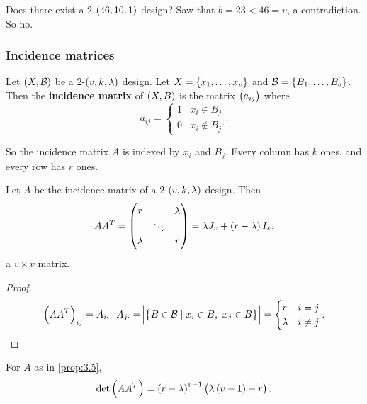 
\begin{example*}
Does there exist a $ 2 $-$ \br{46, 10, 1} $ design? Saw that $ b = 23 < 46 = v $, a contradiction. So no.
\end{example*}

\subsubsection{Incidence matrices}

\begin{definition*}
Let $ \br{X, \BB} $ be a $ 2 $-$ \br{v, k, \lambda} $ design. Let $ X = \cbr{x_1, \dots, x_v} $ and $ \BB = \cbr{B_1, \dots, B_b} $. Then the \textbf{incidence matrix} of $ \br{X, B} $ is the matrix $ \br{a_{ij}} $ where
$$ a_{ij} =
\begin{cases}
1 & x_i \in B_j \\
0 & x_i \notin B_j
\end{cases}.
$$
\end{definition*}

So the incidence matrix $ A $ is indexed by $ x_i $ and $ B_j $. Every column has $ k $ ones, and every row has $ r $ ones.

\begin{proposition}
\label{prop:3.5}
Let $ A $ be the incidence matrix of a $ 2 $-$ \br{v, k, \lambda} $ design. Then
$$ AA^T = \threebythree{r}{}{\lambda}{}{\ddots}{}{\lambda}{}{r} = \lambda J_v + \br{r - \lambda}I_v, $$
a $ v \times v $ matrix.
\end{proposition}

\begin{proof}
$$ \br{AA^T}_{ij} = A_{i\cdot} \cdot A_{j\cdot} = \abs{\cbr{B \in \BB \mid x_i \in B, \ x_j \in B}} =
\begin{cases}
r & i = j \\
\lambda & i \ne j
\end{cases}.
$$
\end{proof}

\begin{proposition}
For $ A $ as in \ref{prop:3.5},
$$ \det\br{AA^T} = \br{r - \lambda}^{v - 1}\br{\lambda\br{v - 1} + r}. $$
\end{proposition}

